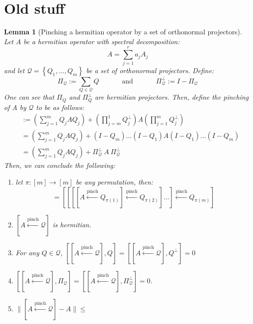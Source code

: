 \documentclass[12pt]{article}
\theoremstyle{plain}
\newtheorem{lemma}[theorem]{Lemma}
\begin{document}
\section{Old stuff}
\begin{lemma}[Pinching a hermitian operator by a set of orthonormal projectors]

Let $A$ be a hermitian operator with spectral decomposition:
\begin{equation}
    A = \sum\limits_{j = 1}^r a_j A_j
\end{equation}
and let $\mathcal{Q} = \left\{Q_1, \dots, Q_m\right\}$ be a set of orthonormal projectors.
Define:
\begin{equation}
    \Pi_{\mathcal{Q}} := \sum\limits_{Q \in \mathcal{Q}} Q \quad\quad\quad \text{ and } \quad\quad\quad \Pi_{\mathcal{Q}}^\bot := I - \Pi_{\mathcal{Q}}
\end{equation}
One can see that $\Pi_Q$ and $\Pi_Q^\bot$ are hermitian projectors. Then, define the pinching of $A$ by $\mathcal{Q}$ to be as follows:
\begin{align*}
    [A \overset{\text{pinch}}{\gets} \mathcal{Q}] &:= \left(\sum\limits_{j = 1}^m Q_j AQ_j\right) + \left(\prod\limits_{j = m}^1 Q_j^\bot\right) A  \left(\prod\limits_{j = 1}^m Q_j^\bot\right)\\
    &= \left(\sum\limits_{j = 1}^m Q_j AQ_j\right) + (I - Q_m) \dots (I-Q_1) A (I - Q_1) \dots (I - Q_m)\\
    &= \left(\sum\limits_{j = 1}^m Q_j AQ_j\right) + \Pi_{\mathcal{Q}}^\bot \ A\ \Pi_{\mathcal{Q}}^\bot
\end{align*}
Then, we can conclude the following:
\begin{enumerate}
    \item let $\pi: [m] \to[m]$ be any permutation, then:
    \begin{equation}
        [A \overset{\text{pinch}}{\gets} \mathcal{Q}] = \left[\left[\left[[A \overset{\text{pinch}}{\gets} Q_{\pi(1)}] \overset{\text{pinch}}{\gets} Q_{\pi(2)}\right]\dots\right] \overset{\text{pinch}}{\gets} Q_{\pi(m)}\right]
    \end{equation}
    \item $[A \overset{\text{pinch}}{\gets} \mathcal{Q}]$ is hermitian.
    \item For any $Q \in \mathcal{Q}$, $\left[[A \overset{\text{pinch}}{\gets} \mathcal{Q}],Q\right] = \left[[A \overset{\text{pinch}}{\gets} \mathcal{Q}],Q^\bot\right] = 0$
    \item $\left[[A \overset{\text{pinch}}{\gets} \mathcal{Q}],\Pi_{\mathcal{Q}}\right] = \left[[A \overset{\text{pinch}}{\gets} \mathcal{Q}],\Pi_{\mathcal{Q}}^\bot\right] = 0$.
    \item $\|[A \overset{\text{pinch}}{\gets} \mathcal{Q}] - A\| \leq $
\end{enumerate}
    
\end{lemma}
\end{document}
